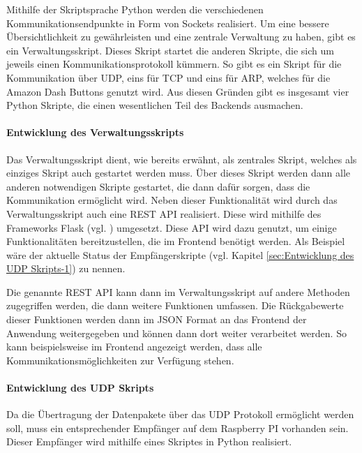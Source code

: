 Mithilfe der Skriptsprache Python werden die verschiedenen Kommunikationsendpunkte in Form von Sockets realisiert. Um eine bessere Übersichtlichkeit zu gewährleisten und eine zentrale Verwaltung zu haben, gibt es ein Verwaltungsskript. Dieses Skript startet die anderen Skripte, die sich um jeweils einen Kommunikationsprotokoll kümmern. So gibt es ein Skript für die Kommunikation über \ac{UDP}, eins für \ac{TCP} und eins für \ac{ARP}, welches für die Amazon Dash Buttons genutzt wird. Aus diesen Gründen gibt es insgesamt vier Python Skripte, die einen wesentlichen Teil des Backends ausmachen.

\paragraph{Entwicklung des Verwaltungsskripts}$\;$ \\  
\label{sec:Entwicklung des Verwaltungsskripts-1} 
Das Verwaltungsskript dient, wie bereits erwähnt, als zentrales Skript, welches als einziges Skript auch gestartet werden muss. Über dieses Skript werden dann alle anderen notwendigen Skripte gestartet, die dann dafür sorgen, dass die Kommunikation ermöglicht wird. 
Neben dieser Funktionalität wird durch das Verwaltungsskript auch eine \ac{REST} \ac{API} realisiert. Diese wird mithilfe des Frameworks Flask (vgl. \cite{.s}) umgesetzt. Diese \ac{API} wird dazu genutzt, um einige Funktionalitäten bereitzustellen, die im Frontend benötigt werden. Als Beispiel wäre der aktuelle Status der Empfängerskripte (vgl. Kapitel \ref{sec:Entwicklung des UDP Skripts-1}) zu nennen. 

Die genannte \ac{REST} \ac{API} kann dann im Verwaltungsskript auf andere Methoden zugegriffen werden, die dann weitere Funktionen umfassen. Die Rückgabewerte dieser Funktionen werden dann im \ac{JSON} Format an das Frontend der Anwendung weitergegeben und können dann dort weiter verarbeitet werden. So kann beispielsweise im Frontend angezeigt werden, dass alle Kommunikationsmöglichkeiten zur Verfügung stehen. 

\paragraph{Entwicklung des \ac{UDP} Skripts}$\;$ \\  
\label{sec:Entwicklung des UDP Skripts-1} 
Da die Übertragung der Datenpakete über das \ac{UDP} Protokoll ermöglicht werden soll, muss ein entsprechender Empfänger auf dem Raspberry PI vorhanden sein. Dieser Empfänger wird mithilfe eines Skriptes in Python realisiert.

